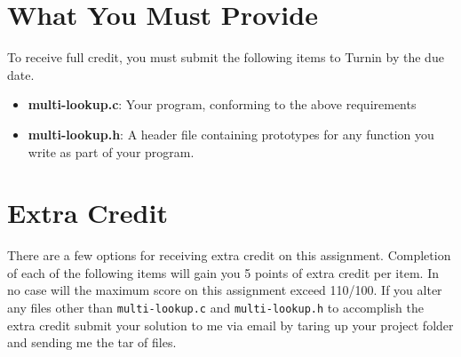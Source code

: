 \documentclass[12pt]{article}
\begin{document}
\section{What You Must Provide}
To receive full credit, you must submit the following items to Turnin
by the due date. 

\begin{itemize}
\item {\bf multi-lookup.c}: Your program, conforming to the above
  requirements
\item {\bf multi-lookup.h}: A header file containing prototypes for any
  function you write as part of your program.
\end{itemize}

\section{Extra Credit}

There are a few options for receiving extra credit on this
assignment. Completion of each of the following items will gain you 5
points of extra credit per item. In no case will the maximum score on
this assignment exceed 110/100. If you alter any files other than {\tt multi-lookup.c} and {\tt multi-lookup.h} to accomplish the extra credit submit your solution to me via email by taring up your project folder and sending me the tar of files. 
\end{document}

